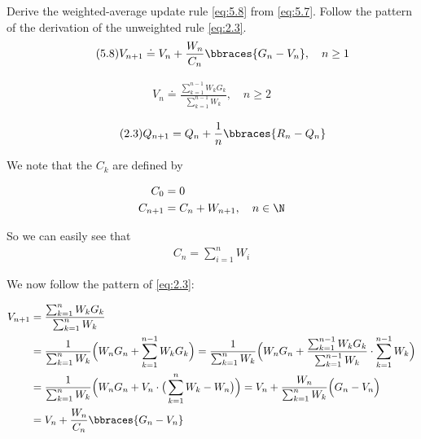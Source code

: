 
\begin{exercise}

Derive the weighted-average update rule \eqref{eq:5.8} from \eqref{eq:5.7}. Follow the pattern of the derivation of the unweighted rule \eqref{eq:2.3}.
\begin{align} \label{eq:5.8} \tag{5.8}
    V_{n+1}
    \doteq
    V_n + \frac{W_n}{C_n} \bbraces{G_n - V_n},
    \quad
    n \geq 1
\end{align}

\begin{align} \label{eq:5.7} \tag{5.7}
    V_n
    \doteq
    \frac
    {
        \sum_{k=1}^{n-1} W_k G_k
    }{
        \sum_{k=1}^{n-1} W_k
    },
    \quad
    n \geq 2
\end{align}

\begin{align} \label{eq:2.3} \tag{2.3}
    Q_{n+1}
    =
    Q_n + \frac{1}{n} \bbraces{R_n - Q_n}
\end{align}
\end{exercise}


\begin{solution}

We note that the $C_k$ are defined by

\begin{align*}
  C_0 &= 0 \\
  C_{n+1} &= C_n + W_{n+1}, \quad n \in \N
\end{align*}

So we can easily see that
\begin{align*}
  C_n = \sum_{i=1}^n W_i
\end{align*}

We now follow the pattern of \eqref{eq:2.3}:

\begin{align*}
  V_{n+1}
  &=
  \frac
  {
      \sum_{k=1}^{n} W_k G_k
  }{
      \sum_{k=1}^{n} W_k
  } \\
  &=
  \frac{1}{\sum_{k=1}^{n} W_k}
  \Big(
    W_n G_n + \sum_{k=1}^{n-1} W_k G_k
  \Big)
  =
  \frac{1}{\sum_{k=1}^{n} W_k}
  \Big(
    W_n G_n + \frac{\sum_{k=1}^{n-1} W_k G_k}{\sum_{k=1}^{n-1} W_k}\cdot \sum_{k=1}^{n-1} W_k
  \Big) \\
  &=
  \frac{1}{\sum_{k=1}^{n} W_k}
  \Big(
    W_n G_n + V_n \cdot \big(\sum_{k=1}^{n} W_k - W_n\big)
  \Big)
  =
  V_n + \frac{W_n}{\sum_{k=1}^{n} W_k}\Big(G_n -V_n\Big) \\
  &=
  V_n + \frac{W_n}{C_n} \bbraces{G_n - V_n}
\end{align*}
\end{solution}

